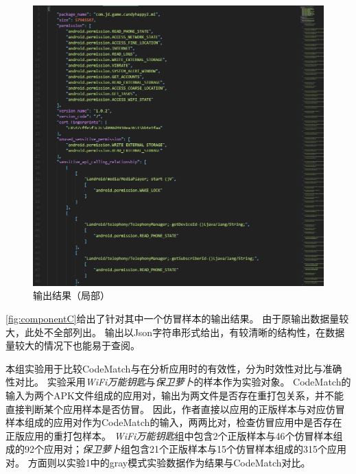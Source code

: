 \begin{figure}[ht]
    \centering
    \includegraphics[width=\textwidth]{./Figures/edwin-component-C.jpg}
    \caption{\componentC 输出结果（局部）}
    \label{fig:componentC}
    \vspace{-3mm}
\end{figure}

\autoref{fig:componentC}给出了\componentC 针对其中一个仿冒样本的输出结果。
由于原输出数据量较大，此处不全部列出。
输出以Json字符串形式给出，有较清晰的结构性，在数据量较大的情况下也能易于查阅。



本组实验用于比较CodeMatch与\mytool 在分析应用时的有效性，分为时效性对比与准确性对比。
实验采用\textit{WiFi万能钥匙}与\textit{保卫萝卜}的样本作为实验对象。
CodeMatch的输入为两个APK文件组成的应用对，输出为两文件是否存在重打包关系，并不能直接判断某个应用样本是否仿冒。
因此，作者直接以应用的正版样本与对应仿冒样本组成的应用对作为CodeMatch的输入，两两比对，检查仿冒应用中是否存在正版应用的重打包样本。
\textit{WiFi万能钥匙}组中包含2个正版样本与46个仿冒样本组成的92个应用对；\textit{保卫萝卜}组包含21个正版样本与15个仿冒样本组成的315个应用对。
\mytool 方面则以实验1中的gray模式实验数据作为结果与CodeMatch对比。


